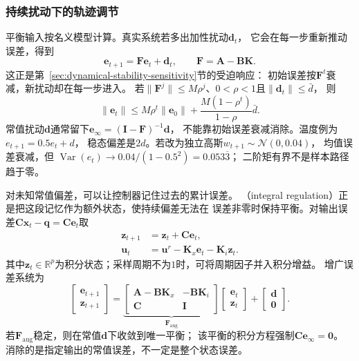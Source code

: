 \subsubsection{持续扰动下的轨迹调节}
平衡输入按名义模型计算。真实系统若多出加性扰动$\bm d_t$，
它会在每一步重新推动误差，得到
\begin{equation}
  \bm e_{t+1}=\bm F\bm e_t+\bm d_t,
  \qquad \bm F=\bm A-\bm B\bm K.
  \label{eq:control-regulation-disturbance}
\end{equation}
这正是第~\ref{sec:dynamical-stability-sensitivity}节的受迫响应：
初始误差按$\bm F^t$衰减，新扰动却在每一步进入。
若$\|\bm F^j\|\leq M\rho^j$、$0<\rho<1$且$\|\bm d_t\|\leq\bar d$，
则
\[
  \|\bm e_t\|\leq M\rho^t\|\bm e_0\|
       +\frac{M(1-\rho^t)}{1-\rho}\bar d.
\]
常值扰动$\bm d$通常留下$\bm e_\infty=(\bm I-\bm F)^{-1}\bm d$，
不能靠初始误差衰减消除。温度例为$e_{t+1}=0.5e_t+d$，
稳态偏差是$2d$。若改为独立高斯$w_{t+1}\sim\mathcal N(0,0.04)$，
均值误差衰减，但
$\operatorname{Var}(e_t)\to0.04/(1-0.5^2)=0.053\overline3$；
二阶矩有界不是样本路径趋于零。

对未知常值偏差，可以让控制器记住过去的累计误差。
（integral regulation）正是把这段记忆作为额外状态，使持续偏差无法在
误差非零时保持平衡。对输出误差$\bm C\bm x_t-\bm q=\bm C\bm e_t$取
\begin{equation}
  \begin{aligned}
    \bm z_{t+1}&=\bm z_t+\bm C\bm e_t,\\
    \bm u_t&=\bm u^r-\bm K_x\bm e_t-\bm K_i\bm z_t.
  \end{aligned}
  \label{eq:control-integral-regulation}
\end{equation}
其中$\bm z_t\in\mathbb R^p$为积分状态；采样周期不为$1$时，可将周期因子并入积分增益。
增广误差系统为
\[
  \begin{bmatrix}\bm e_{t+1}\\\bm z_{t+1}\end{bmatrix}
  =
  \underbrace{\begin{bmatrix}
    \bm A-\bm B\bm K_x&-\bm B\bm K_i\\
    \bm C&\bm I
  \end{bmatrix}}_{\bm F_{\mathrm{aug}}}
  \begin{bmatrix}\bm e_t\\\bm z_t\end{bmatrix}
  +\begin{bmatrix}\bm d\\\bm0\end{bmatrix}.
\]
若$\bm F_{\mathrm{aug}}$稳定，则在常值$\bm d$下收敛到唯一平衡；
该平衡的积分方程强制$\bm C\bm e_\infty=\bm0$。
消除的是指定输出的常值误差，不一定是整个状态误差。

